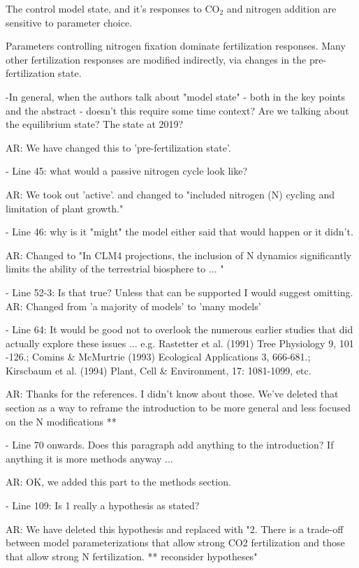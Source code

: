 \documentclass{article}
\begin{document}
\textsf{The control model state, and it's responses to CO$_{2}$ and nitrogen addition are sensitive to parameter choice.}

\textsf{Parameters controlling nitrogen fixation dominate fertilization responses. Many other fertilization responses are modified indirectly, via changes in the pre-fertilization state.}

-In general, when the authors talk about "model state" - both in the key points and the abstract - doesn't this require some time context? Are we talking about the equilibrium state? The state at 2019? 

\textsf{AR: We have changed this to 'pre-fertilization state'. }

- Line 45: what would a passive nitrogen cycle look like? 

\textsf{AR:  We took out 'active'. and changed to "included nitrogen (N) cycling and limitation of plant growth."}

- Line 46: why is it "might" the model either said that would happen or it didn't. 

\textsf{AR: Changed to "In CLM4 projections, the inclusion of N dynamics significantly limits the ability of the terrestrial biosphere to ... "}

- Line 52-3: Is that true? Unless that can be supported I would suggest omitting. 
\textsf{AR: Changed from 'a majority of models' to 'many models'}

- Line 64: It would be good not to overlook the numerous earlier studies that did actually explore these issues ... e.g. Rastetter et al. (1991) Tree Physiology 9, 101 -126.; Comins \& McMurtrie (1993) Ecological Applications 3, 666-681.; Kirscbaum et al. (1994) Plant, Cell \& Environment, 17: 1081-1099, etc. 

\textsf{AR: Thanks for the references. I didn't know about those. We've deleted that section as a way to reframe the introduction to be more general and less focused on the N modifications **}

- Line 70 onwards. Does this paragraph add anything to the introduction? If anything it is more methods anyway ... 

\textsf{AR: OK, we added this part to the methods section. }

- Line 109: Is 1 really a hypothesis as stated? 

\textsf{AR: We have deleted this hypothesis and replaced with "2. There is a trade-off between model parameterizations that allow strong CO2 fertilization and those that allow strong N fertilization. ** reconsider hypotheses"}
\end{document}
